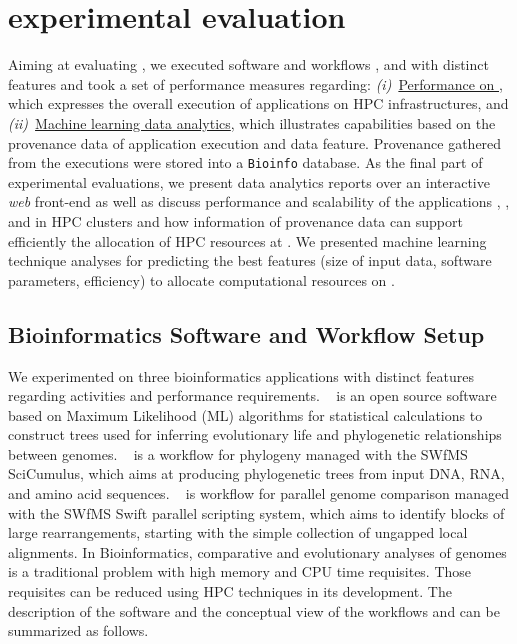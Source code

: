 \section{\system experimental evaluation}\label{sec:experiments}
\vspace{-2px}
Aiming at evaluating \system, we executed software \raxml and workflows \sci, and \swift with distinct features and took a set of performance measures regarding:
\textit{(i)}~\underline{Performance on \system}, which expresses the overall execution of applications on HPC infrastructures, and 
\textit{(ii)}~\underline{Machine learning data analytics}, which illustrates \system capabilities based on the provenance data of application execution and data feature. Provenance gathered from the executions were stored into a \texttt{Bioinfo} database. As the final part of experimental evaluations, we present \system data analytics reports over an interactive \textit{web} front-end as well as discuss performance and scalability of the applications \raxml, \sci, and \swift in HPC clusters and how information of provenance data can support efficiently the allocation of HPC resources at \system. We presented machine learning technique analyses for predicting the best features (size of input data, software parameters, efficiency) to allocate computational resources on \system.

\subsection{Bioinformatics Software and Workflow Setup}

We experimented on three bioinformatics applications with distinct features regarding activities and performance requirements. \raxml~\cite{sciphy} is an open source software based on Maximum Likelihood (ML) algorithms for statistical calculations to construct trees used for inferring evolutionary life and phylogenetic relationships between genomes.
\sci~\cite{sciphy} is a workflow for phylogeny managed with the SWfMS SciCumulus, which aims at producing phylogenetic trees from input DNA, RNA, and amino acid sequences. 
\swift~\cite{montage} is workflow for parallel genome comparison managed with the SWfMS Swift parallel scripting system, which aims to identify blocks of large rearrangements, starting with the simple collection of ungapped local alignments. In Bioinformatics, comparative and evolutionary analyses of genomes is a traditional problem with high memory and CPU time requisites. Those requisites can be reduced using HPC techniques in its development.
The description of the software \raxml and the conceptual view of the workflows \sci and \swift can be summarized as follows. 

